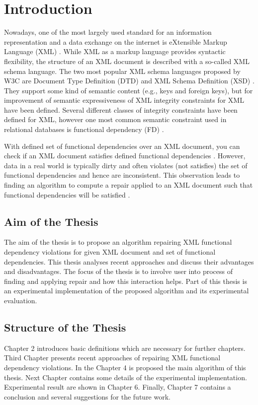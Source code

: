 \chapter{Introduction}

Nowadays, one of the most largely used standard for an information representation and a data exchange on the internet is eXtensible Markup Language (XML) \cite{xml}. While XML as a markup language provides syntactic flexibility, the structure of an XML document is described with a so-called XML schema language. The two most popular XML schema languages proposed by W3C are Document Type Definition (DTD) \cite{xml} and XML Schema Definition (XSD) \cite{xsd1,xsd2,xsd3}. They support some kind of semantic content (e.g., keys and foreign keys), but for improvement of semantic expressiveness of XML integrity constraints for XML \cite{ic} have been defined. Several different classes of integrity constraints have been defined for XML, however one most common semantic constraint used in relational databases is functional dependency (FD) \cite{fd}.

With defined set of functional dependencies over an XML document, you can check if an XML document satisfies defined functional dependencies \cite{satifFD}. However, data in a real world is typically dirty and often violates (not satisfies) the set of functional dependencies and hence are inconsistent. This observation leads to finding an algorithm to compute a repair applied to an XML document such that functional dependencies will be satisfied \cite{RepAndConsistentAnswer, QueryXML, ImprovingXML}.

\section{Aim of the Thesis}

The aim of the thesis is to propose an algorithm repairing XML functional dependency violations for given XML document and set of functional dependencies. This thesis analyses recent approaches and discuss their advantages and disadvantages. The focus of the thesis is to involve user into process of finding and applying repair and how this interaction helps. Part of this thesis is an experimental implementation of the proposed algorithm and its experimental evaluation.

\section{Structure of the Thesis}

Chapter 2 introduces basic definitions which are necessary for further chapters. Third Chapter presents recent approaches of repairing XML functional dependency violations. In the Chapter 4 is proposed the main algorithm of this thesis. Next Chapter contains some details of the experimental implementation. Experimental result are shown in Chapter 6. Finally, Chapter 7 contains a conclusion and several suggestions for the future work.
